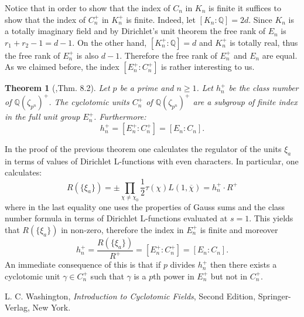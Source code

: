 \documentclass[12pt]{article}
\newtheorem{thm1}{Theorem}
\theoremstyle{definition}
\newcommand{\Rats}{\mathbb{Q}}
\begin{document}
Notice that in order to show that the index of $C_n$ in $K_n$ is
finite it suffices to show that the index of $C_n^+$ in $K_n^+$ is
finite. Indeed, let $[K_n:\Rats]=2d$. Since $K_n$ is a totally
imaginary field and by Dirichlet's unit theorem the free rank of
$E_n$ is $r_1+r_2-1=d-1$. On the other hand, $[K_n^+:\Rats]=d$ and
$K_n^+$ is totally real, thus the free rank of $E_n^+$ is also
$d-1$. Therefore the free rank of $E_n^+$ and $E_n$ are equal. As
we claimed before, the index $[E_n^+:C_n^+]$ is rather interesting
to us.
\begin{thm1}[\cite{wash},Thm. 8.2]
\label{cycloindex} Let $p$ be a prime and $n\geq 1$. Let $h^+_{n}$
be the class number of $\Rats(\zeta_{p^n})^+$. The cyclotomic
units $C_{n}^+$ of $\Rats(\zeta_{p^n})^+$ are a subgroup of finite
index in the full unit group $E_{n}^+$. Furthermore:
$$h^+_{n}=[E_{n}^+:C^+_{n}]=[E_n:C_n].$$
\end{thm1}
In the proof of the previous theorem one calculates the regulator
of the units $\xi_a$ in terms of values of Dirichlet L-functions
with even characters. In particular, one calculates:
$$R(\{\xi_a\})=\pm\prod_{\chi\neq
\chi_0}\frac{1}{2}\tau(\chi)L(1,\overline{\chi})=h^+_{n}\cdot
R^+$$ where in the last equality one uses the properties of Gauss
sums and the class number formula in terms of Dirichlet
L-functions evaluated at $s=1$. This yields that $R(\{\xi_a\})$ in
non-zero, therefore the index in $E_n^+$ is finite and moreover
$$h^+_{n}=\frac{R(\{\xi_a\})}{R^+}=[E_{n}^+:C^+_{n}]=[E_n:C_n].$$
An immediate consequence of this is that if $p$ divides $h^+_{n}$
then there exists a cyclotomic unit $\gamma \in C_n^+$ such that
$\gamma$ is a $p$th power in $E_{n}^+$ but not in $C_n^+$.

\begin{thebibliography}{00}
 L. C. Washington, {\em Introduction to Cyclotomic
Fields}, Second Edition, Springer-Verlag, New York.

\end{thebibliography}
\end{document}
